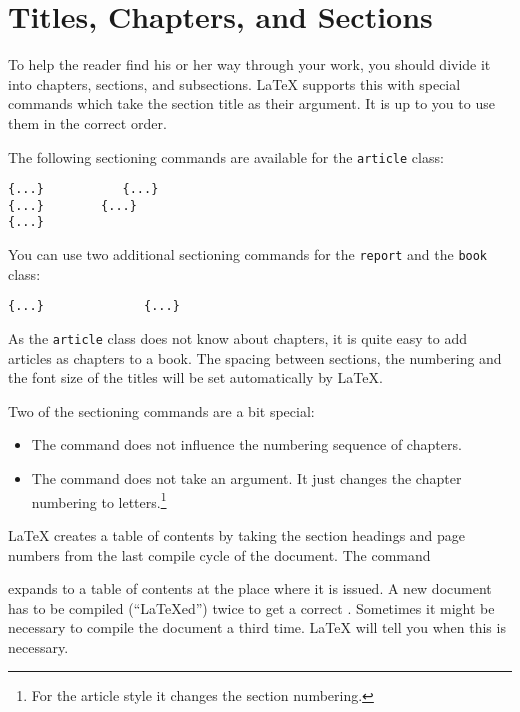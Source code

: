 \section{Titles, Chapters, and Sections}

To help the reader find his or her way through your work, you should
divide it into chapters, sections, and subsections.  \LaTeX{} supports
this with special commands which take the section title as their
argument.  It is up to you to use them in the correct order.

The following sectioning commands are available for the
\texttt{article} class: \nopagebreak
\begin{code}
\verb|{...}           |\verb|{...}|\\
\verb|{...}        |\verb|{...}|\\
\verb|{...}|
\end{code}

You can use two additional sectioning commands for the \texttt{report}
and the \texttt{book} class:
\begin{code}
\verb|{...}              |\verb|{...}|
\end{code}

As the \texttt{article} class does not know about chapters, it is quite easy
to add articles as chapters to a book.
The spacing between sections, the numbering and the font size of the
titles will be set automatically by \LaTeX. 

\pagebreak[3]
Two of the sectioning commands are a bit special: 
\begin{itemize}
\item The  command does
  not influence the numbering sequence of chapters.  
\item The  command does not take an argument. It just
  changes the chapter numbering to letters.\footnote{For the article
    style it changes the section numbering.}
\end{itemize}



\LaTeX{} creates a table of contents by taking the section headings
and page numbers from the last compile cycle of the document. The command 
\begin{lscommand} 
\end{lscommand} 
\noindent expands to a table of contents at the place where it
is issued. A new
document has to be compiled (``\LaTeX ed'') twice to get a
correct . Sometimes it might be
necessary to compile the document a third time. \LaTeX{} will tell you
when this is necessary.

